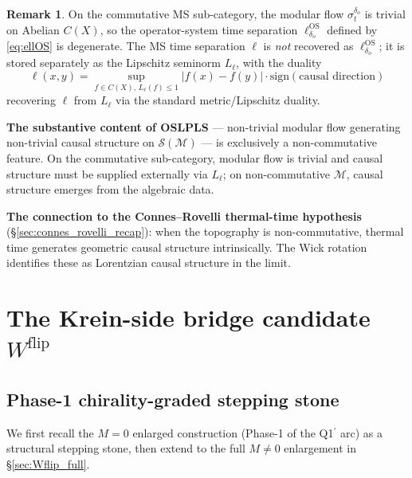 \documentclass[11pt,a4paper]{article}
\theoremstyle{plain}
\theoremstyle{definition}
\newtheorem{remark}[theorem]{Remark}
\newcommand{\Scal}{\mathcal{S}}
\newcommand{\Mcal}{\mathcal{M}}
\newcommand{\ellOS}{\ell^{\mathrm{OS}}}
\newcommand{\Wflip}{W^{\mathrm{flip}}}
\begin{document}
\begin{remark}\label{rem:commutative_degenerate}
On the commutative MS sub-category, the modular flow
$\sigma_{t}^{\delta_{o}}$ is trivial on Abelian $C(X)$, so the
operator-system time separation $\ellOS_{\delta_{o}}$ defined by
\eqref{eq:ellOS} is degenerate. The MS time separation $\ell$ is
\emph{not} recovered as $\ellOS_{\delta_{o}}$; it is stored
separately as the Lipschitz seminorm $L_{\ell}$, with the duality
\[
  \ell(x,y) = \sup_{f\in C(X),\,L_{\ell}(f)\le 1} |f(x)-f(y)|\cdot\mathrm{sign}(\text{causal direction})
\]
recovering $\ell$ from $L_{\ell}$ via the standard metric/Lipschitz
duality.

\textbf{The substantive content of OSLPLS} --- non-trivial modular
flow generating non-trivial causal structure on $\Scal(\Mcal)$ ---
is exclusively a non-commutative feature. On the commutative
sub-category, modular flow is trivial and causal structure must be
supplied externally via $L_{\ell}$; on non-commutative $\Mcal$,
causal structure emerges from the algebraic data.

\textbf{The connection to the Connes--Rovelli thermal-time
hypothesis} (\S\ref{sec:connes_rovelli_recap}): when the topography is
non-commutative, thermal time generates geometric causal structure
intrinsically. The Wick rotation identifies these as Lorentzian causal
structure in the limit.
\end{remark}

\section{The Krein-side bridge candidate $\Wflip$}\label{sec:bridge_candidate}

\subsection{Phase-1 chirality-graded stepping stone}
\label{sec:phase1_stepping_stone}

We first recall the $M=0$ enlarged construction (Phase-1 of the
Q1$^{\prime}$ arc) as a structural stepping stone, then extend to the
full $M\ne 0$ enlargement in \S\ref{sec:Wflip_full}.
\end{document}
